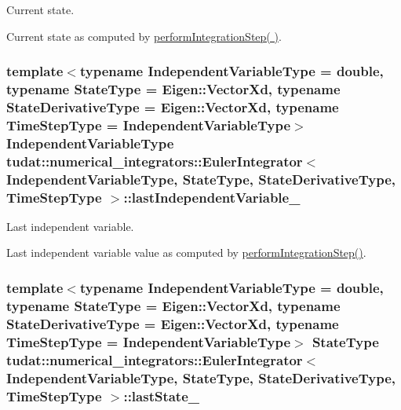 Current state. 

Current state as computed by \hyperlink{classtudat_1_1numerical__integrators_1_1EulerIntegrator_a6ff2ab6fbde6cb97cfe77961963e4910}{perform\+Integration\+Step( )}. 
\subsubsection[{\texorpdfstring{last\+Independent\+Variable\+\_\+}{lastIndependentVariable_}}]{\setlength{\rightskip}{0pt plus 5cm}template$<$typename Independent\+Variable\+Type  = double, typename State\+Type  = Eigen\+::\+Vector\+Xd, typename State\+Derivative\+Type  = Eigen\+::\+Vector\+Xd, typename Time\+Step\+Type  = Independent\+Variable\+Type$>$ Independent\+Variable\+Type {\bf tudat\+::numerical\+\_\+integrators\+::\+Euler\+Integrator}$<$ Independent\+Variable\+Type, State\+Type, State\+Derivative\+Type, Time\+Step\+Type $>$\+::last\+Independent\+Variable\+\_\+\hspace{0.3cm}{\ttfamily [protected]}}\hypertarget{classtudat_1_1numerical__integrators_1_1EulerIntegrator_a19d04fd16d5ef487d089007f44315ee3}{}\label{classtudat_1_1numerical__integrators_1_1EulerIntegrator_a19d04fd16d5ef487d089007f44315ee3}


Last independent variable. 

Last independent variable value as computed by \hyperlink{classtudat_1_1numerical__integrators_1_1EulerIntegrator_a6ff2ab6fbde6cb97cfe77961963e4910}{perform\+Integration\+Step()}. 
\subsubsection[{\texorpdfstring{last\+State\+\_\+}{lastState_}}]{\setlength{\rightskip}{0pt plus 5cm}template$<$typename Independent\+Variable\+Type  = double, typename State\+Type  = Eigen\+::\+Vector\+Xd, typename State\+Derivative\+Type  = Eigen\+::\+Vector\+Xd, typename Time\+Step\+Type  = Independent\+Variable\+Type$>$ State\+Type {\bf tudat\+::numerical\+\_\+integrators\+::\+Euler\+Integrator}$<$ Independent\+Variable\+Type, State\+Type, State\+Derivative\+Type, Time\+Step\+Type $>$\+::last\+State\+\_\+\hspace{0.3cm}{\ttfamily [protected]}}\hypertarget{classtudat_1_1numerical__integrators_1_1EulerIntegrator_acf89c8e5e22c6836f2479468a595216a}{}\label{classtudat_1_1numerical__integrators_1_1EulerIntegrator_acf89c8e5e22c6836f2479468a595216a}


